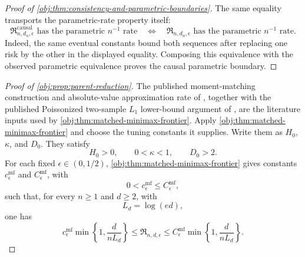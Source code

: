 \documentclass[11pt]{article}
\begin{document}
\begin{proof}[Proof of \cref{obj:thm:consistency-and-parametric-boundaries}]
The same equality transports the parametric-rate property itself:
\[
\mathfrak R^{\mathrm{causal}}_{n,d_n,\epsilon}
\text{ has the parametric }n^{-1}\text{ rate}
\quad\Longleftrightarrow\quad
\mathfrak R_{n,d_n,\epsilon}
\text{ has the parametric }n^{-1}\text{ rate}.
\]
Indeed, the same eventual constants bound both sequences after replacing one risk by the other in the displayed equality.  Composing this equivalence with the observed parametric equivalence proves the causal parametric boundary. %
\end{proof}

\begin{proof}[Proof of \cref{obj:prop:parent-reduction}]
The published moment-matching construction and absolute-value approximation rate of
\citep[Lemma 1 and Section 3.1]{CaiLow2011L1}, together with the published Poissonized two-sample
\(L_1\) lower-bound argument of \citep[Theorem 3 and equation (24)]{JiaoHanWeissman2018L1},
are the literature inputs used by \cref{obj:thm:matched-minimax-frontier}. Apply
\cref{obj:thm:matched-minimax-frontier} and choose the tuning constants it supplies. Write them as
\(H_0\), \(\kappa\), and \(D_0\). They satisfy
\[
H_0>0,\qquad 0<\kappa<1,\qquad D_0>2 .
\]
For each fixed \(\epsilon\in(0,1/2)\), \cref{obj:thm:matched-minimax-frontier} gives constants
\(c_\epsilon^{\mathrm{mf}}\) and \(C_\epsilon^{\mathrm{mf}}\), with
\[
0<c_\epsilon^{\mathrm{mf}}\le C_\epsilon^{\mathrm{mf}},
\]
such that, for every \(n\ge1\) and \(d\ge2\), with
\[
L_d=\log(ed),
\]
one has
\[
c_\epsilon^{\mathrm{mf}}
\min\left\{1,\frac{d}{nL_d}\right\}
\le
\mathfrak R_{n,d,\epsilon}
\le
C_\epsilon^{\mathrm{mf}}
\min\left\{1,\frac{d}{nL_d}\right\}.
\]


\end{proof}
\end{document}
